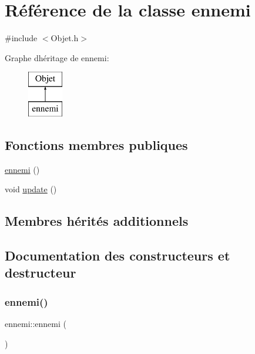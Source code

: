 \hypertarget{classennemi}{}\section{Référence de la classe ennemi}
\label{classennemi}


{\ttfamily \#include $<$Objet.\+h$>$}

Graphe d\textquotesingle{}héritage de ennemi\+:\begin{figure}[H]
\begin{center}
\leavevmode
\includegraphics[height=2.000000cm]{classennemi}
\end{center}
\end{figure}
\subsection*{Fonctions membres publiques}
\begin{DoxyCompactItemize}
\item 
\hyperlink{classennemi_a7bd90d9f0e75fe07265e922a56b8a6c8}{ennemi} ()
\item 
void \hyperlink{classennemi_a52bb08c9e3c5597d0019857dc43f3351}{update} ()
\end{DoxyCompactItemize}
\subsection*{Membres hérités additionnels}


\subsection{Documentation des constructeurs et destructeur}
\mbox{\label{classennemi_a7bd90d9f0e75fe07265e922a56b8a6c8}} 
\subsubsection{\texorpdfstring{ennemi()}{ennemi()}}
{\footnotesize\ttfamily ennemi\+::ennemi (\begin{DoxyParamCaption}{ }\end{DoxyParamCaption})\hspace{0.3cm}{\ttfamily [inline]}}



